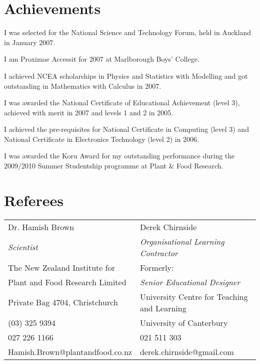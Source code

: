 \documentclass[10pt]{article}
\newenvironment{packed_items}{
    \begin{itemize}
    \setlength{\itemsep}{1pt}
    \setlength{\parskip}{0pt}
    \setlength{\parsep}{0pt}
}{\end{itemize}}
\begin{document}
    \section*{Achievements}
        \begin{packed_items}
            \item{I was selected for the National Science and Technology Forum, held in Auckland in January 2007.}
            \item{I am Proximae Accessit for 2007 at Marlborough Boys’ College.}
            \item{I achieved NCEA scholarships in Physics and Statistics with Modelling and got outstanding in Mathematics with Calculus in 2007.}
            \item{I was awarded the National Certificate of Educational Achievement (level 3), achieved with merit in 2007 and levels 1 and 2 in 2005.}
            \item{I achieved the pre-requisites for National Certificate in Computing (level 3) and National Certificate in Electronics Technology (level 2) in 2006.}
            \item{I was awarded the Koru Award for my outstanding performance during the 2009/2010 Summer Studentship programme at Plant \& Food Research.}
        \end{packed_items}
    \section*{Referees}
        \begin{tabularx}{\textwidth}{XX}
            Dr. Hamish Brown                & Derek Chirnside                                    \\
            \emph{Scientist}                & \emph{Organisational Learning Contractor}          \\
            The New Zealand Institute for   & Formerly:                                          \\
            Plant and Food Research Limited & \qquad \emph{Senior Educational Designer}          \\
            Private Bag 4704, Christchurch  & \qquad University Centre for Teaching and Learning \\
            (03) 325 9394                   & \qquad University of Canterbury                    \\
            027 226 1166                    & 021 511 303                                        \\
            Hamish.Brown@plantandfood.co.nz & derek.chirnside@gmail.com                          \\
        \end{tabularx}
\end{document}
